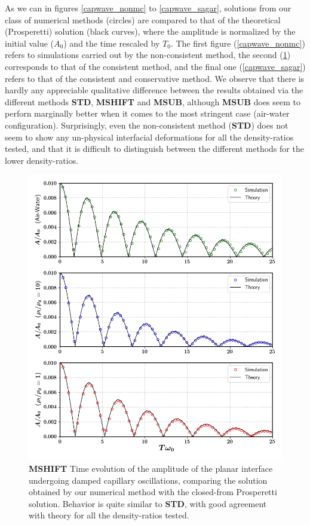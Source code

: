 As we can in figures \ref{capwave_nonmc} to \ref{capwave_sagar}, solutions from our class of numerical methods (circles) are compared to that of the theoretical (Prosperetti) solution (black curves), where the amplitude is normalized by the initial value ($A_0$) and the time rescaled by $T_0$. The first figure (\ref{capwave_nonmc}) refers to simulations carried out by the non-consistent method, the second (\ref{capwave_daniel}) corresponds to that of the consistent method, and the final one (\ref{capwave_sagar}) refers to that of the consistent and conservative method. We observe that there is hardly any appreciable qualitative difference between the results obtained via the different methods \textbf{STD}, \textbf{MSHIFT} and \textbf{MSUB}, although \textbf{MSUB} does seem to perforn marginally better when it comes to the most stringent case (air-water configuration). Surprisingly, even the non-consistent method (\textbf{STD}) does not seem to show any un-physical interfacial deformations for all the density-ratios tested, and that it is difficult to distinguish between the different methods for the lower density-ratios.  

\begin{figure}[h!]
    \centering
    \includegraphics[width = 1.0\textwidth]{plots/capwave/compare_daniel.png}
	\caption{\textbf{MSHIFT} Time evolution of the amplitude of the planar interface undergoing damped capillary oscillations, comparing the solution obtained by our numerical method with the closed-from Prosperetti solution. Behavior is quite similar to \textbf{STD}, with good agreement with theory for all the density-ratios tested. }
    \label{capwave_daniel}
\end{figure}


